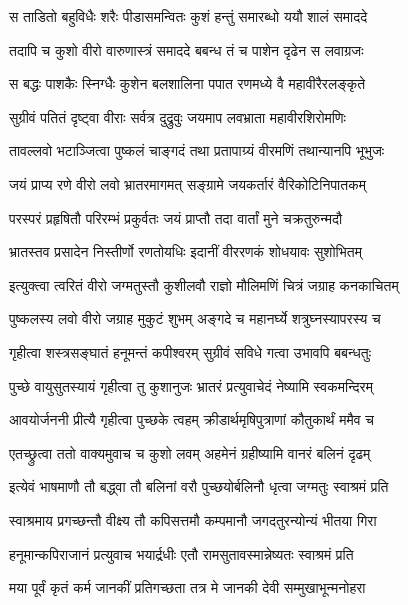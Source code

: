 \twolineshloka
{स ताडितो बहुविधैः शरैः पीडासमन्वितः}
{कुशं हन्तुं समारब्धो ययौ शालं समाददे}%

\twolineshloka
{तदापि च कुशो वीरो वारुणास्त्रं समाददे}
{बबन्ध तं च पाशेन दृढेन स लवाग्रजः}%

\twolineshloka
{स बद्धः पाशकैः स्निग्धैः कुशेन बलशालिना}
{पपात रणमध्ये वै महावीरैरलङ्कृते}%

\twolineshloka
{सुग्रीवं पतितं दृष्ट्वा वीराः सर्वत्र दुद्रुवुः}
{जयमाप लवभ्राता महावीरशिरोमणिः}%

\twolineshloka
{तावल्लवो भटाञ्जित्वा पुष्कलं चाङ्गदं तथा}
{प्रतापाग्र्यं वीरमणिं तथान्यानपि भूभुजः}%

\twolineshloka
{जयं प्राप्य रणे वीरो लवो भ्रातरमागमत्}
{सङ्ग्रामे जयकर्तारं वैरिकोटिनिपातकम्}%

\twolineshloka
{परस्परं प्रहृषितौ परिरम्भं प्रकुर्वतः}
{जयं प्राप्तौ तदा वार्तां मुने चक्रतुरुन्मदौ}%


\twolineshloka
{भ्रातस्तव प्रसादेन निस्तीर्णो रणतोयधिः}
{इदानीं वीररणकं शोधयावः सुशोभितम्}%

\twolineshloka
{इत्युक्त्वा त्वरितं वीरो जग्मतुस्तौ कुशीलवौ}
{राज्ञो मौलिमणिं चित्रं जग्राह कनकाचितम्}%

\twolineshloka
{पुष्कलस्य लवो वीरो जग्राह मुकुटं शुभम्}
{अङ्गदे च महानर्घ्ये शत्रुघ्नस्यापरस्य च}%

\twolineshloka
{गृहीत्वा शस्त्रसङ्घातं हनूमन्तं कपीश्वरम्}
{सुग्रीवं सविधे गत्वा उभावपि बबन्धतुः}%

\twolineshloka
{पुच्छे वायुसुतस्यायं गृहीत्वा तु कुशानुजः}
{भ्रातरं प्रत्युवाचेदं नेष्यामि स्वकमन्दिरम्}%

\twolineshloka
{आवयोर्जननी प्रीत्यै गृहीत्वा पुच्छके त्वहम्}
{क्रीडार्थमृषिपुत्राणां कौतुकार्थं ममैव च}%

\twolineshloka
{एतच्छ्रुत्वा ततो वाक्यमुवाच च कुशो लवम्}
{अहमेनं ग्रहीष्यामि वानरं बलिनं दृढम्}%

\twolineshloka
{इत्येवं भाषमाणौ तौ बद्ध्वा तौ बलिनां वरौ}
{पुच्छयोर्बलिनौ धृत्वा जग्मतुः स्वाश्रमं प्रति}%

\twolineshloka
{स्वाश्रमाय प्रगच्छन्तौ वीक्ष्य तौ कपिसत्तमौ}
{कम्पमानौ जगदतुरन्योन्यं भीतया गिरा}%

\twolineshloka
{हनूमान्कपिराजानं प्रत्युवाच भयार्द्रधीः}
{एतौ रामसुतावस्मान्नेष्यतः स्वाश्रमं प्रति}%

\twolineshloka
{मया पूर्वं कृतं कर्म जानकीं प्रतिगच्छता}
{तत्र मे जानकी देवी सम्मुखाभून्मनोहरा}%

